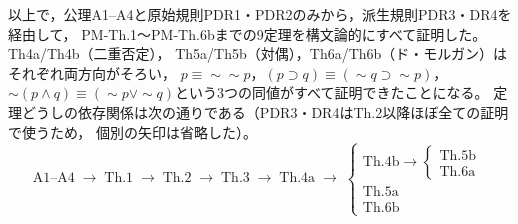 \documentclass[autodetect-engine,dvi=dvipdfmx,ja=standard]{bxjsarticle}
\begin{document}
以上で，公理A1--A4と原始規則PDR1・PDR2のみから，派生規則PDR3・DR4を経由して，
PM-Th.1〜PM-Th.6bまでの9定理を構文論的にすべて証明した。Th4a/Th4b（二重否定），
Th5a/Th5b（対偶），Th6a/Th6b（ド・モルガン）はそれぞれ両方向がそろい，
\(p\equiv\sim\sim p\)，\((p\supset q)\equiv(\sim q\supset\sim p)\)，
\(\sim(p\land q)\equiv(\sim p\lor\sim q)\)という3つの同値がすべて証明できたことになる。
定理どうしの依存関係は次の通りである（PDR3・DR4はTh.2以降ほぼ全ての証明で使うため，
個別の矢印は省略した）。
\[
  \mathrm{A1\text{--}A4}
  \;\to\;
  \mathrm{Th.1}
  \;\to\;
  \mathrm{Th.2}
  \;\to\;
  \mathrm{Th.3}
  \;\to\;
  \mathrm{Th.4a}
  \;\to\;
  \begin{cases}
    \mathrm{Th.4b} \to
    \begin{cases}
      \mathrm{Th.5b}\\
      \mathrm{Th.6a}
    \end{cases}\\
    \mathrm{Th.5a}\\
    \mathrm{Th.6b}
  \end{cases}
\]
\end{document}
